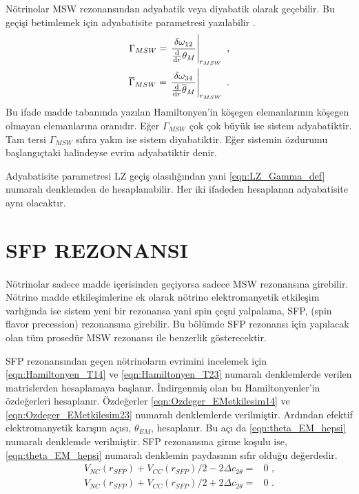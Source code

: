 Nötrinolar MSW rezonansından adyabatik veya diyabatik olarak geçebilir. Bu geçişi betimlemek için adyabatisite parametresi yazılabilir \cite{Giunti:2007ry}. 
\begin{align}
	\Gamma_{MSW} = \eval{\frac{\delta \omega_{12}}{\dv{r}\theta_{M}}}_{r_{MSW}} \text{ ,} \\
	\overline{\Gamma}_{MSW} = \eval{\frac{\delta \omega_{34}}{\dv{r}\overline{\theta}_{M}}}_{r_{MSW}} \text{ .}
\end{align}
Bu ifade madde tabanında yazılan Hamiltonyen'in köşegen elemanlarının köşegen olmayan elemanlarına oranıdır. Eğer $ \Gamma_{MSW} $ çok çok büyük ise sistem adyabatiktir. Tam tersi $ \Gamma_{MSW} $ sıfıra yakın ise sistem diyabatiktir. Eğer sistemin özdurumu başlangıçtaki halindeyse evrim adyabatiktir denir.

Adyabatisite parametresi LZ geçiş olasılığından yani \eqref{eqn:LZ_Gamma_def} numaralı denklemden de hesaplanabilir. Her iki ifadeden hesaplanan adyabatisite aynı olacaktır.

\section{SFP REZONANSI}\label{sec:sfpRezonansi}
\paragraph{}
Nötrinolar sadece madde içerisinden geçiyorsa sadece MSW rezonansına girebilir. Nötrino madde etkileşimlerine ek olarak nötrino elektromanyetik etkileşim varlığında ise sistem yeni bir rezonansa yani spin çeşni yalpalama, SFP, (spin flavor precession) rezonansına girebilir. Bu bölümde SFP rezonansı için yapılacak olan tüm prosedür MSW rezonansı ile benzerlik gösterecektir. 


SFP rezonansından geçen nötrinoların evrimini incelemek için \eqref{eqn:Hamiltonyen_T14} ve \eqref{eqn:Hamiltonyen_T23} numaralı denklemlerde verilen matrislerden hesaplamaya başlanır. İndirgenmiş olan bu Hamiltonyenler'in özdeğerleri hesaplanır. Özdeğerler \eqref{eqn:Ozdeger_EMetkilesim14} ve \eqref{eqn:Ozdeger_EMetkilesim23} numaralı denklemlerde verilmiştir. Ardından efektif elektromanyetik karışım açısı, $ \theta_{EM} $, hesaplanır. Bu açı da \eqref{eqn:theta_EM_hepsi} numaralı denklemde verilmiştir. SFP rezonansına girme koşulu ise, \eqref{eqn:theta_EM_hepsi} numaralı denklemin paydasının sıfır olduğu değerdedir.
\begin{align}\label{eqn:SFPresonanceConditions}
	V_{NC}(r_{SFP}) + V_{CC}(r_{SFP})/2 - 2\Delta c_{2\theta} =& 0 \text{ ,} \\
	V_{NC}(r_{SFP}) + V_{CC}(r_{SFP})/2 + 2\Delta c_{2\theta} =& 0 \text{ .}
\end{align}


